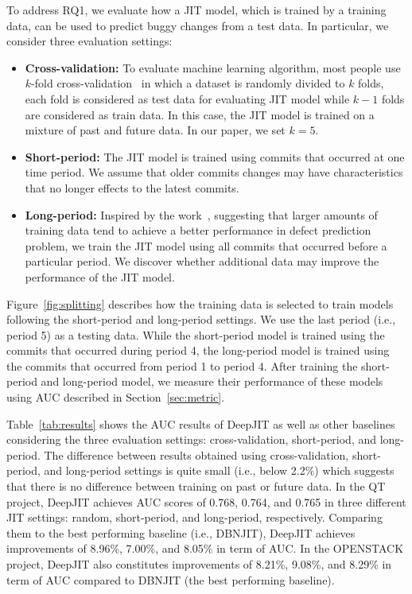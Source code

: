 To address RQ1, we evaluate how a JIT model, which is trained by a training data, can be used to predict buggy changes from a test data. In particular, we consider three evaluation settings: 
\begin{itemize}
\item \textbf{Cross-validation:} To evaluate machine learning algorithm, most people use $k$-fold cross-validation~\cite{kohavi1995study} in which a dataset is randomly divided to $k$ folds, each fold is considered as test data for evaluating JIT model while $k - 1$ folds are considered as train data. In this case, the JIT model is trained on a mixture of past and future data. In our paper, we set $k = 5$.
\item \textbf{Short-period:} The JIT model is trained using commits that occurred at one time period. We assume that older commits changes may have characteristics that no longer effects to the latest commits. 
\item \textbf{Long-period:} Inspired by the work~\cite{rahman2013sample}, suggesting that larger amounts of training data tend to achieve a better performance in defect prediction problem, we train the JIT model using all commits that occurred before a particular period. We discover whether additional data may improve the performance of the JIT model. 
\end{itemize} 

Figure~\ref{fig:splitting} describes how the training data is selected to train models  following the short-period and long-period settings. We use the last period (i.e., period 5) as a testing data. While the short-period model is trained using the commits that occurred during period 4, the long-period model is trained using the commits that occurred from period 1 to period 4. After training the short-period and long-period model, we measure their performance of these models using AUC described in Section~\ref{sec:metric}.

Table~\ref{tab:results} shows the AUC results of DeepJIT as well as other baselines considering the three evaluation settings: cross-validation, short-period, and long-period. The difference between results obtained using cross-validation, short-period, and long-period settings is quite small (i.e., below 2.2\%) which suggests that there is no difference between training on past or future data. 
In the QT project, DeepJIT achieves AUC scores of 0.768, 0.764, and 0.765 in three different JIT settings: random, short-period, and long-period, respectively. Comparing them to the best performing baseline (i.e., DBNJIT), DeepJIT achieves improvements of 8.96\%, 7.00\%, and 8.05\% in term of AUC. In the OPENSTACK project, DeepJIT also constitutes improvements of 8.21\%, 9.08\%, and 8.29\% in term of AUC compared to DBNJIT (the best performing baseline). 

